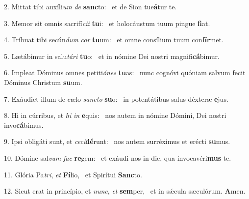2. Mittat tibi auxíli\textit{um} \textit{de} \textbf{sanc}to: \ast\  et de Sion tue\textbf{á}tur te.\

3. Memor sit omnis sacrifí\textit{ci}\textit{i} \textbf{tu}i: \ast\  et holocáustum tuum pingue \textbf{fi}at.\

4. Tríbuat tibi secún\textit{dum} \textit{cor} \textbf{tu}um: \ast\  et omne consílium tuum con\textbf{fír}met.\

5. Lætábimur in salu\textit{tá}\textit{ri} \textbf{tu}o: \ast\  et in nómine Dei nostri magnifi\textbf{cá}bimur.\

6. Impleat Dóminus omnes petiti\textit{ó}\textit{nes} \textbf{tu}as: \ast\  nunc cognóvi quóniam salvum fecit Dóminus Christum \textbf{su}um.\

7. Exáudiet illum de cælo \textit{sanc}\textit{to} \textbf{su}o: \ast\  in potentátibus salus déxteræ \textbf{e}jus.\

8. Hi in cúrribus, et \textit{hi} \textit{in} \textbf{e}quis: \ast\  nos autem in nómine Dómini, Dei nostri invo\textbf{cá}bimus.\

9. Ipsi obligáti sunt, et \textit{ce}\textit{ci}\textbf{dé}runt: \ast\  nos autem surréximus et erécti \textbf{su}mus.\

10. Dómine sal\textit{vum} \textit{fac} \textbf{re}gem: \ast\  et exáudi nos in die, qua invocavéri\textbf{mus} te.\

11. Glória Pa\textit{tri}, \textit{et} \textbf{Fí}lio, \ast\  et Spirítui \textbf{Sanc}to.\

12. Sicut erat in princípio, et \textit{nunc}, \textit{et} \textbf{sem}per, \ast\  et in sǽcula sæculórum. \textbf{A}men.\

